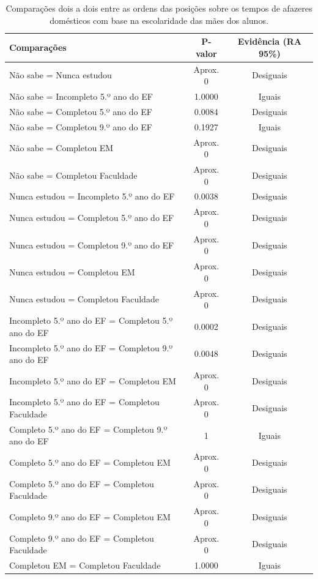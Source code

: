 \newpage
\begin{table}[htb]
    \centering
\caption{Comparações dois a dois entre as ordens das posições sobre os tempos de afazeres domésticos
com base na escolaridade das mães dos alunos.}
    \begin{tabular}{lcc}
    \toprule
    Comparações & P-valor & Evidência (RA 95\%)\\
    \midrule \midrule
    Não sabe = Nunca estudou & Aprox. 0 & Desiguais\\
    Não sabe = Incompleto 5.º ano do EF  & 1.0000 & Iguais\\
    Não sabe = Completou 5.º ano do EF  & 0.0084 & Desiguais\\
    Não sabe = Completou 9.º ano do EF  & 0.1927 & Iguais\\
    Não sabe = Completou EM & Aprox. 0 & Desiguais\\
    Não sabe = Completou Faculdade & Aprox. 0 & Desiguais\\
    Nunca estudou = Incompleto 5.º ano do EF  & 0.0038 & Desiguais\\
    Nunca estudou = Completou 5.º ano do EF  & Aprox. 0 & Desiguais\\
    Nunca estudou = Completou 9.º ano do EF  & Aprox. 0 & Desiguais\\
    Nunca estudou = Completou EM & Aprox. 0 & Desiguais\\
    Nunca estudou = Completou Faculdade & Aprox. 0 & Desiguais\\
    Incompleto 5.º ano do EF = Completou 5.º ano do EF  & 0.0002 & Desiguais\\
    Incompleto 5.º ano do EF = Completou 9.º ano do EF  & 0.0048 & Desiguais\\
    Incompleto 5.º ano do EF = Completou EM & Aprox. 0 & Desiguais\\
    Incompleto 5.º ano do EF = Completou Faculdade & Aprox. 0 & Desiguais\\
    Completo 5.º ano do EF = Completou 9.º ano do EF  & 1 & Iguais\\
    Completo 5.º ano do EF = Completou EM & Aprox. 0 & Desiguais\\
    Completo 5.º ano do EF = Completou Faculdade & Aprox. 0 & Desiguais\\
    Completo 9.º ano do EF = Completou EM & Aprox. 0 & Desiguais\\
    Completo 9.º ano do EF = Completou Faculdade & Aprox. 0 & Desiguais\\
    Completou EM = Completou Faculdade & 1.0000 & Iguais\\
    \bottomrule
    \end{tabular}
    \centering
    
\end{table}




